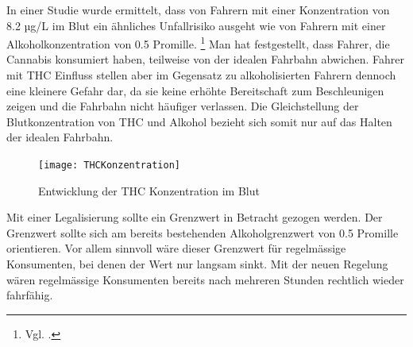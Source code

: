 \documentclass[../main.tex]{subfiles}
\begin{document}
	 \noindent	 
	 In einer Studie wurde ermittelt, dass von Fahrern mit einer Konzentration von 8.2 µg/L im Blut ein ähnliches Unfallrisiko ausgeht wie von Fahrern mit einer Alkoholkonzentration von 0.5 Promille.%
	 \footnote{Vgl. \cite{hartman-2015}.}
	 Man hat festgestellt, dass Fahrer, die Cannabis konsumiert haben, teilweise von der idealen Fahrbahn abwichen.
	 Fahrer mit THC Einfluss stellen aber im Gegensatz zu alkoholisierten Fahrern dennoch eine kleinere Gefahr dar, da sie keine erhöhte Bereitschaft zum Beschleunigen zeigen und die Fahrbahn nicht häufiger verlassen.
	 Die Gleichstellung der Blutkonzentration von THC und Alkohol bezieht sich somit nur auf das Halten der idealen Fahrbahn.\\
	 
	 
	 \noindent	 
	 \begin{figure}[H]
	 	\centering
		\texttt{[image: THCKonzentration]}
		\captionsetup{font=small}
		\caption[Entwicklung der THC Konzentration im Blut]{Entwicklung der THC Konzentration im Blut\protect\footnotemark}		
	 \end{figure}
	
	 \noindent
	 Mit einer Legalisierung sollte ein Grenzwert in Betracht gezogen werden.
	 Der Grenzwert sollte sich am bereits bestehenden Alkoholgrenzwert von 0.5 Promille orientieren. 
	 Vor allem sinnvoll wäre dieser Grenzwert für regelmässige Konsumenten, bei denen der Wert nur langsam sinkt.
	 Mit der neuen Regelung wären regelmässige Konsumenten bereits nach mehreren Stunden rechtlich wieder fahrfähig.	 
	 
\end{document}
